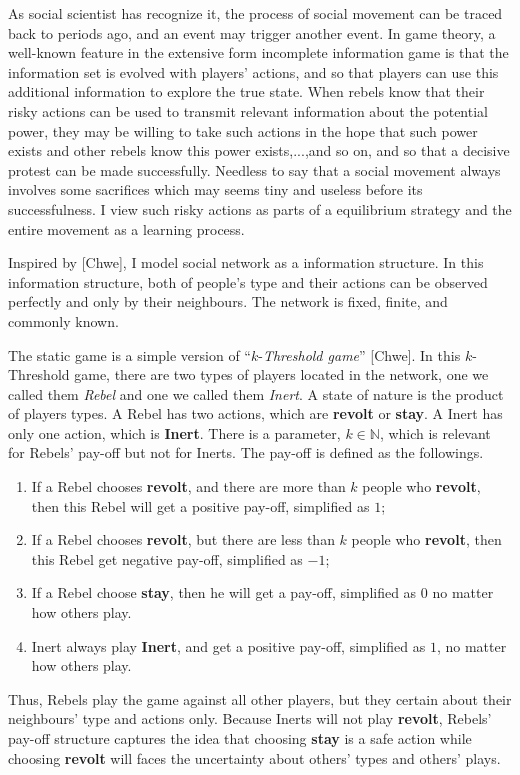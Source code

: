 \documentclass[12pt,letter]{article}
\theoremstyle{remark}
\theoremstyle{remark}
\theoremstyle{claim}
\begin{document}
As social scientist has recognize it, the process of social movement can be traced back to periods ago, and an event may trigger another event. In game theory, a well-known feature in the extensive form incomplete information game is that the information set is evolved with players' actions, and so that players can use this additional information to explore the true state. When rebels know that their risky actions can be used to transmit relevant information about the potential power, they may be willing to take such actions in the hope that such power exists and other rebels know this power exists,...,and so on, and so that a decisive protest can be made successfully. Needless to say that a social movement always involves some sacrifices which may seems tiny and useless before its successfulness. I view such risky actions as parts of a equilibrium strategy and the entire movement as a learning process. 

Inspired by [Chwe], I model social network as a information structure. In this information structure, {both} of people's type and their actions can be observed {perfectly and only} by their neighbours. The network is fixed, finite, and commonly known. 

The static game is a simple version of ``$k$-\textit{Threshold game}'' [Chwe]. In this $k$-Threshold game, there are two types of players located in the network, one we called them \textit{Rebel} and one we called them \textit{Inert}. A state of nature is the product of players types. A Rebel has two actions, which are \textbf{revolt} or \textbf{stay}. A Inert has only one action, which is \textbf{Inert}. There is a parameter, $k\in \mathbb{N}$, which is relevant for Rebels' pay-off but not for Inerts. The pay-off is defined as the followings. 
\begin{enumerate}
\item If a Rebel chooses \textbf{revolt}, and there are more than $k$ people who \textbf{revolt}, then this Rebel will get a positive pay-off, simplified as $1$;
\item If a Rebel chooses \textbf{revolt}, but there are less than $k$ people who \textbf{revolt}, then this Rebel get negative pay-off, simplified  as $-1$;
\item If a Rebel choose \textbf{stay}, then he will get a pay-off, simplified as $0$ no matter how others play.
\item Inert always play \textbf{Inert}, and get a positive pay-off, simplified as $1$, no matter how others play. 
\end{enumerate}
Thus, Rebels play the game against all other players, but they certain about their neighbours' type and actions only. Because Inerts will not play \textbf{revolt}, Rebels' pay-off structure captures the idea that choosing \textbf{stay} is a safe action while choosing \textbf{revolt} will faces the uncertainty about others' types and others' plays. 
\end{document}
